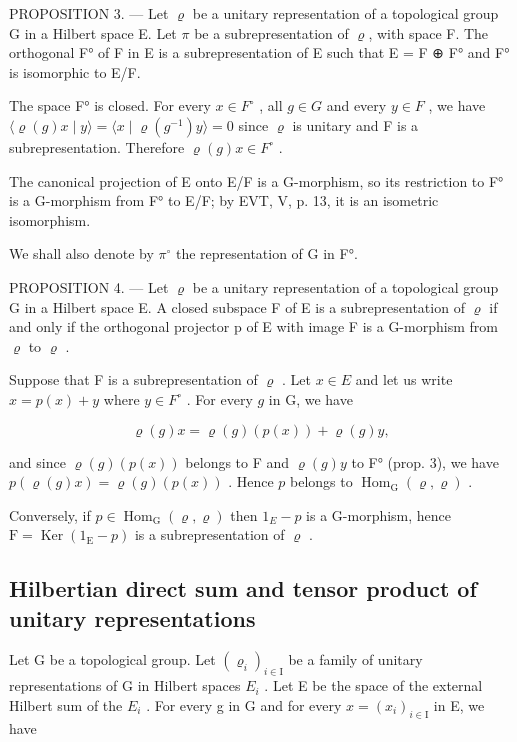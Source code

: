 PROPOSITION 3. --- Let \(\varrho\) be a unitary representation of a topological group G in a Hilbert space E. Let \(\pi\) be a subrepresentation of \(\varrho\), with space F. The orthogonal F° of F in E is a subrepresentation of E such that E = F ⊕ F° and F° is isomorphic to E/F.

The space F° is closed. For every \(x \in F^{\circ}\) , all \(g \in G\) and every \(y \in F\) , we have \(\langle \varrho(g)x \mid y \rangle = \langle x \mid \varrho(g^{-1})y \rangle = 0\) since \(\varrho\) is unitary and F is a subrepresentation. Therefore \(\varrho(g)x \in F^{\circ}\) .

The canonical projection of E onto E/F is a G-morphism, so its restriction to F° is a G-morphism from F° to E/F; by EVT, V, p. 13, it is an isometric isomorphism.

We shall also denote by \(\pi^{\circ}\) the representation of G in F°.

PROPOSITION 4. --- Let \(\varrho\) be a unitary representation of a topological group G in a Hilbert space E. A closed subspace F of E is a subrepresentation of \(\varrho\) if and only if the orthogonal projector p of E with image F is a G-morphism from \(\varrho\) to \(\varrho\) .

Suppose that F is a subrepresentation of \(\varrho\) . Let \(x \in E\) and let us write \(x = p(x) + y\) where \(y \in F^{\circ}\) . For every \(g\) in G, we have

\[
\varrho (g) x = \varrho (g) (p (x)) + \varrho (g) y,
\]

and since \(\varrho(g)(p(x))\) belongs to F and \(\varrho(g)y\) to F° (prop. 3), we have \(p(\varrho(g)x) = \varrho(g)(p(x))\) . Hence \(p\) belongs to \(\operatorname{Hom}_{\mathrm{G}}(\varrho, \varrho)\) .

Conversely, if \(p \in \operatorname{Hom}_{\mathrm{G}}(\varrho, \varrho)\) then \(1_{E} - p\) is a G-morphism, hence \(\mathrm{F} = \operatorname{Ker}(1_{\mathrm{E}} - p)\) is a subrepresentation of \(\varrho\) .

\subsection{Hilbertian direct sum and tensor product of unitary representations}

Let G be a topological group. Let \((\varrho_{i})_{i\in\mathrm{I}}\) be a family of unitary representations of G in Hilbert spaces \(E_{i}\) . Let E be the space of the external Hilbert sum of the \(E_{i}\) . For every g in G and for every \(x=(x_{i})_{i\in\mathrm{I}}\) in E, we have

